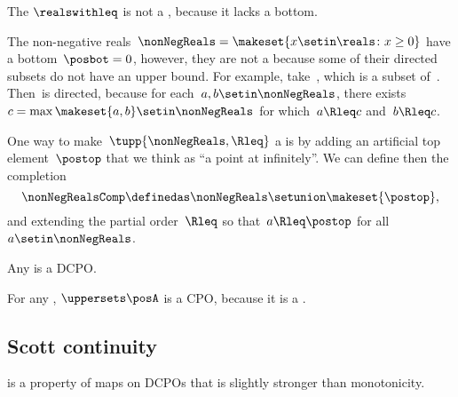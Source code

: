 \begin{example}
    \label{exa:Rcomp}
    The  $\realswithleq$ is not a \CPO, because it lacks a bottom.

    The non-negative reals~$\nonNegReals=\makeset{x\setin\reals \colon x\geq0}$ have a bottom~$\posbot=0$, however, they are not a \DCPO because some of their directed subsets do not have an upper bound.
    For example, take~\nonNegReals, which is a subset of~\nonNegReals .
    Then~\nonNegReals  is directed, because for each~$a,b\setin\nonNegReals$, there exists~$c=\max\makeset{a,b}\setin\nonNegReals$ for which~$a\Rleq c$ and~$b\Rleq c$.

    One way to make~$\tupp{ \nonNegReals,\Rleq} $ a \CPO is by adding an artificial top element~$\postop$ that we think as ``a point at infinitely''.
    We can define then the completion
    \begin{equation}
        \nonNegRealsComp\definedas\nonNegReals\setunion\makeset{\postop},
    \end{equation} and extending the partial order~$\Rleq$ so that~$a\Rleq\postop$ for all~$a\setin\nonNegReals$.
\end{example}

\begin{example}
    Any  is a DCPO.
\end{example}
\begin{example}
    For any  \posA, $\uppersets \posA$ is a CPO, because it is a .
\end{example}

\subsection{Scott continuity}

 is a property of maps on DCPOs that is slightly stronger than monotonicity.

